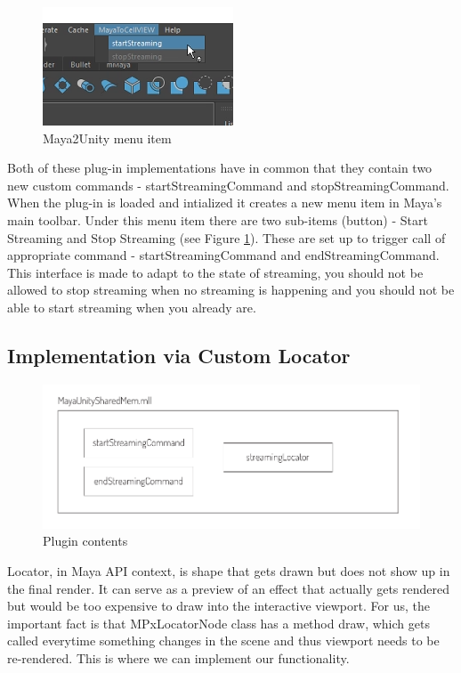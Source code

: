 \documentclass[
  digital, %
  table,   %
  nolof,     %
  nolot,     %
]{fithesis3}
\begin{document}
\begin{figure}
  \centering
  \includegraphics{images/maya-to-unity-menu.png}
  \caption{Maya2Unity menu item}
  \label{fig:maya-menu-item}
\end{figure}

Both of these plug-in implementations have in common that they contain two new custom commands - startStreamingCommand and stopStreamingCommand. When the plug-in is loaded and intialized it creates a new menu item in Maya's main toolbar. Under this menu item there are two sub-items (button) - Start Streaming and Stop Streaming (see Figure \ref{fig:maya-menu-item}). These are set up to trigger call of appropriate command - startStreamingCommand and endStreamingCommand. This interface is made to adapt to the state of streaming, you should not be allowed to stop streaming when no streaming is happening and you should not be able to start streaming when you already are.

\subsection{Implementation via Custom Locator}
\begin{figure}
  \centering
  \includegraphics[scale=0.8]{images/plugin-contents.pdf}
  \caption{Plugin contents}
  \label{fig:plugin-content}
\end{figure}
Locator, in Maya API context, is shape that gets drawn but does not show up in the final render. It can serve as a preview of an effect that actually gets rendered but would be too expensive to draw into the interactive viewport. For us, the important fact is that MPxLocatorNode class has a method draw, which gets called everytime something changes in the scene and thus viewport needs to be re-rendered. This is where we can implement our functionality.
\end{document}
